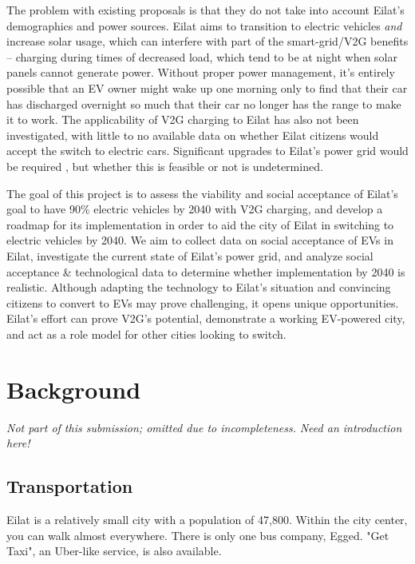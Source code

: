 \documentclass{report}                         %
\begin{document}
The problem with existing proposals is that they do not take into account Eilat's demographics and power sources. Eilat aims to transition to electric vehicles \textit{and} increase solar usage, which can interfere with part of the smart-grid/V2G benefits -- charging during times of decreased load, which tend to be at night when solar panels cannot generate power. Without proper power management, it's entirely possible that an EV owner might wake up one morning only to find that their car has discharged overnight so much that their car no longer has the range to make it to work. The applicability of V2G charging to Eilat has also not been investigated, with little to no available data on whether Eilat citizens would accept the switch to electric cars. Significant upgrades to Eilat's power grid would be required \cite{Vardimon2011AssessmentIsrael}, but whether this is feasible or not is undetermined. 

The goal of this project is to assess the viability and social acceptance of Eilat's goal to have 90\% electric vehicles by 2040 with V2G charging, and develop a roadmap for its implementation in order to aid the city of Eilat in switching to electric vehicles by 2040. We aim to collect data on social acceptance of EVs in Eilat, investigate the current state of Eilat's power grid, and analyze social acceptance \& technological data to determine whether implementation by 2040 is realistic. Although adapting the technology to Eilat's situation and convincing citizens to convert to EVs may prove challenging, it opens unique opportunities. Eilat's effort can prove V2G's potential, demonstrate a working EV-powered city, and act as a role model for other cities looking to switch.

\newpage
\chapter{Background}
\textit{Not part of this submission; omitted due to incompleteness.}
\textit{Need an introduction here!}

\section{Transportation}
Eilat is a relatively small city with a population of 47,800. Within the city center, you can walk almost everywhere. There is only one bus company, Egged. \cite{TransportationEilat} "Get Taxi", an Uber-like service, is also available. 
\end{document}
